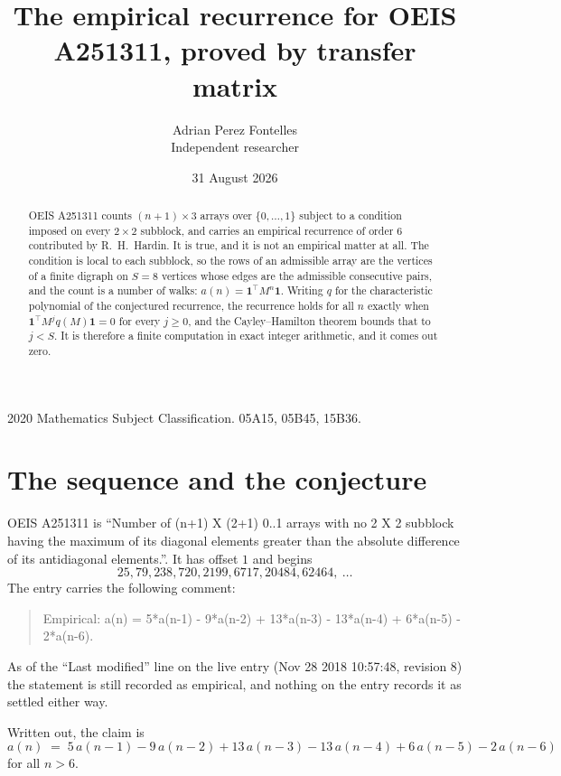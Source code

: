 \documentclass[11pt,a4paper]{article}
\title{The empirical recurrence for OEIS A251311, proved by transfer matrix}
\author{Adrian Perez Fontelles\\ \small Independent researcher}
\date{31 August 2026}
\theoremstyle{plain}
\theoremstyle{definition}
\begin{document}
\maketitle

\begin{abstract}
OEIS A251311 counts $(n+1)\times3$ arrays over $\{0,\dots,1\}$ subject to a condition imposed on
every $2\times2$ subblock, and carries an empirical recurrence of order $6$ contributed
by R.~H.~Hardin. It is true, and it is not an empirical matter at all. The condition is local
to each subblock, so the rows of an admissible array are the vertices of a finite digraph
on $S=8$ vertices whose edges are the admissible consecutive pairs, and the count is a
number of walks: $a(n)=\mathbf{1}^{\!\top}M^{n}\mathbf{1}$. Writing $q$
for the characteristic polynomial of the conjectured recurrence, the recurrence holds for all
$n$ exactly when $\mathbf{1}^{\!\top}M^{j}q(M)\mathbf{1}=0$ for every $j\ge0$, and the
Cayley--Hamilton theorem bounds that to $j<S$. It is therefore a finite computation in exact
integer arithmetic, and it comes out zero.
\end{abstract}

\noindent\small 2020 Mathematics Subject Classification. 05A15, 05B45, 15B36.\normalsize

\section{The sequence and the conjecture}

OEIS A251311 is ``Number of (n+1) X (2+1) 0..1 arrays with no 2 X 2 subblock having the maximum of its diagonal elements greater than the absolute difference of its antidiagonal elements.''. It has offset $1$ and begins
\[
25, 79, 238, 720, 2199, 6717, 20484, 62464,\ \dots
\]
The entry carries the following comment:
\begin{quote}\small
Empirical: a(n) = 5*a(n-1) - 9*a(n-2) + 13*a(n-3) - 13*a(n-4) + 6*a(n-5) - 2*a(n-6).
\end{quote}
As of the ``Last modified'' line on the live entry (Nov 28 2018 10:57:48, revision 8) the statement is
still recorded as empirical, and nothing on the entry records it as settled either way.

Written out, the claim is
\begin{equation}\label{eq:conj}
a(n)\;=\;5\,a(n-1) - 9\,a(n-2) + 13\,a(n-3) - 13\,a(n-4) + 6\,a(n-5) - 2\,a(n-6)
\end{equation}
for all $n>6$.
\end{document}
